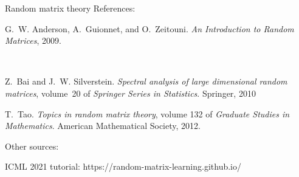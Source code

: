 \documentclass[english,aspectratio=1610]{beamer} %
\begin{document}
\begin{frame}{Random matrix theory}
References:

\vspace{10pt}
\begin{itemize}\tiny{
    \item G.~W. Anderson, A.~Guionnet, and O.~Zeitouni.
\emph{An {Introduction} to {Random} {Matrices}}, 2009.}\\
 \item \tiny{Z.~Bai and J.~W. Silverstein.
\emph{Spectral analysis of large dimensional random matrices},
  volume~20 of \emph{Springer {Series} in {Statistics}}.
Springer, 2010}
\item \tiny{T.~Tao. \emph{Topics in random matrix theory}, volume 132 of \emph{Graduate
  {Studies} in {Mathematics}}. American Mathematical Society, 2012.}
\end{itemize}

\vspace{20pt}

Other sources:


\vspace{10pt}
\begin{itemize}\tiny{
    \item ICML 2021 tutorial: https://random-matrix-learning.github.io/}
\end{itemize}

\end{frame}
\end{document}
